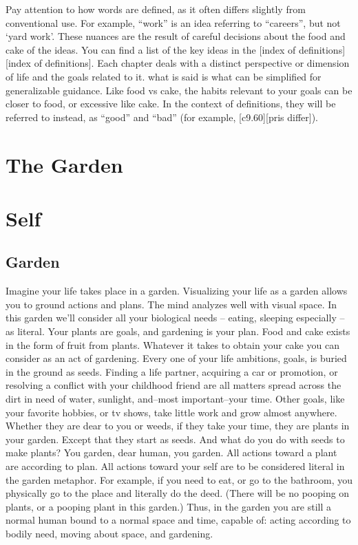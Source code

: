\documentclass[
]{book}
\begin{document}
Pay attention to how words are defined, as it often differs slightly from conventional use.
For example, ``work'' is an idea referring to ``careers'', but not `yard work'.
These nuances are the result of careful decisions about the food and cake of the ideas.
You can find a list of the key ideas in the {[}index of definitions{]}{[}index of definitions{]}.
Each chapter deals with a distinct perspective or dimension of life and the goals related to it. what is said is what can be simplified for generalizable guidance.
Like food vs cake, the habits relevant to your goals can be closer to food, or excessive like cake.
In the context of definitions, they will be referred to instead, as ``good'' and ``bad'' (for example, {[}c9.60{]}{[}pris differ{]}).

\chapter*{The Garden}\label{the-garden}

\chapter{Self}\label{self}

\section{Garden}\label{garden}

Imagine your life takes place in a garden.
Visualizing your life as a garden allows you to ground actions and plans.
The mind analyzes well with visual space.
In this garden we'll consider all your biological needs -- eating, sleeping especially -- as literal.
Your plants are goals, and gardening is your plan.
Food and cake exists in the form of fruit from plants.
Whatever it takes to obtain your cake you can consider as an act of gardening.
Every one of your life ambitions, goals, is buried in the ground as seeds.
Finding a life partner, acquiring a car or promotion, or resolving a conflict with your childhood friend are all matters spread across the dirt in need of water, sunlight, and--most important--your time.
Other goals, like your favorite hobbies, or tv shows, take little work and grow almost anywhere.
Whether they are dear to you or weeds, if they take your time, they are plants in your garden.
Except that they start as seeds.
And what do you do with seeds to make plants? You garden, dear human, you garden.
All actions toward a plant are according to plan.
All actions toward your self are to be considered literal in the garden metaphor.
For example, if you need to eat, or go to the bathroom, you physically go to the place and literally do the deed.
(There will be no pooping on plants, or a pooping plant in this garden.)
Thus, in the garden you are still a normal human bound to a normal space and time, capable of: acting according to bodily need, moving about space, and gardening.
\end{document}
